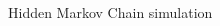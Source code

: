 \documentclass{beamer}\usepackage[]{graphicx}\usepackage[]{color}
\begin{document}
\begin{frame}[fragile]{Hidden Markov Chain simulation}
\begin{columns}
\begin{column}{0.4\textwidth}
\end{column}
\end{columns}
\end{frame}
\end{document}
